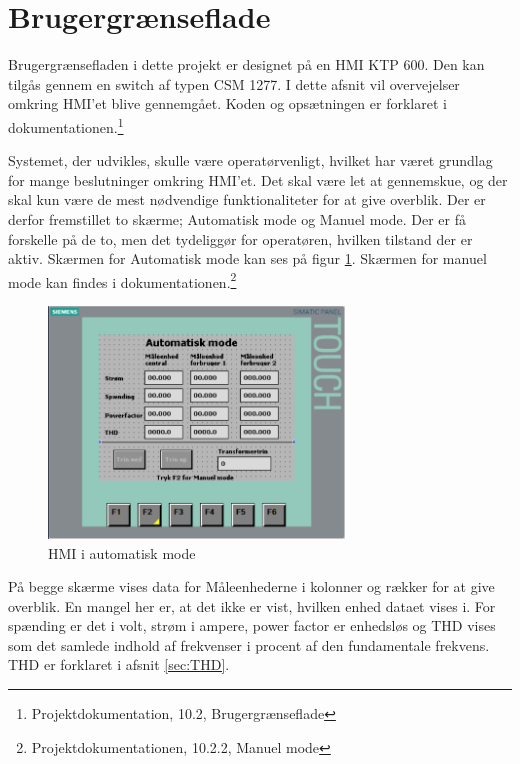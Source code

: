 

\section{Brugergrænseflade}

Brugergrænsefladen i dette projekt er designet på en HMI KTP 600. Den kan tilgås gennem en switch af typen CSM 1277. I dette afsnit vil overvejelser omkring HMI'et blive gennemgået. Koden og opsætningen er forklaret i dokumentationen.\footnote{Projektdokumentation, 10.2, Brugergrænseflade}


Systemet, der udvikles, skulle være operatørvenligt, hvilket har været grundlag for mange beslutninger omkring HMI'et. Det skal være let at gennemskue, og der skal kun være de mest nødvendige funktionaliteter for at give overblik.
Der er derfor fremstillet to skærme; Automatisk mode og Manuel mode. Der er få forskelle på de to, men det tydeliggør for operatøren, hvilken tilstand der er aktiv. Skærmen for Automatisk mode kan ses på figur \ref{fig:HMIAutomatiskModeDesign}. Skærmen for manuel mode kan findes i dokumentationen.\footnote{Projektdokumentationen, 10.2.2, Manuel mode}

\begin{figure}[H] %
	\centering
	\includegraphics[width=0.7\textwidth]{Figure/HMIAutomatiskModeDesign}
	\caption{HMI i automatisk mode}
	\label{fig:HMIAutomatiskModeDesign}
\end{figure}

På begge skærme vises data for Måleenhederne i kolonner og rækker for at give overblik. En mangel her er, at det ikke er vist, hvilken enhed dataet vises i. For spænding er det i volt, strøm i ampere, power factor er enhedsløs og THD vises som det samlede indhold af frekvenser i procent af den fundamentale frekvens. THD er forklaret i afsnit \ref{sec:THD}.


